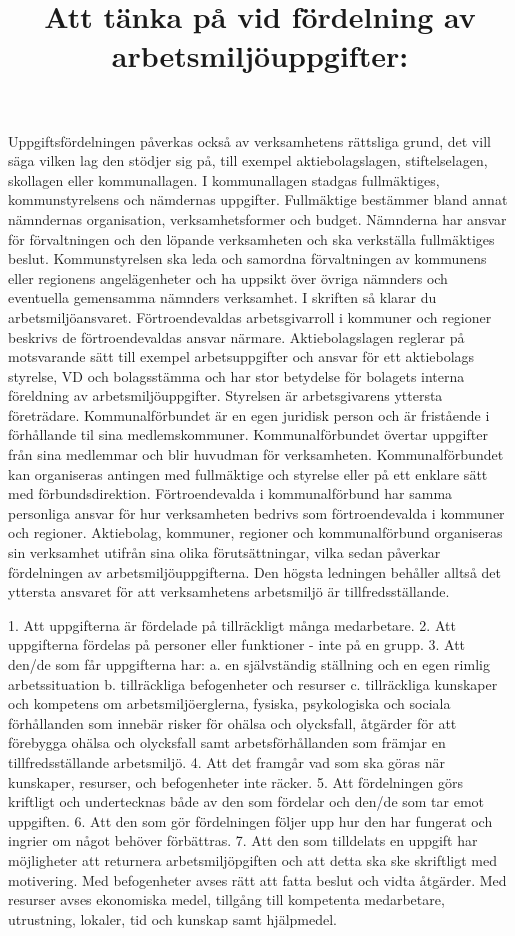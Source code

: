 Uppgiftsfördelningen påverkas också av verksamhetens rättsliga grund, det vill säga vilken lag den stödjer sig på, till exempel aktiebolagslagen, stiftelselagen, skollagen eller kommunallagen.
I kommunallagen stadgas fullmäktiges, kommunstyrelsens och nämdernas uppgifter. Fullmäktige bestämmer bland annat nämndernas organisation, verksamhetsformer och budget. Nämnderna har ansvar för förvaltningen och den löpande verksamheten och ska verkställa fullmäktiges beslut. Kommunstyrelsen ska leda och samordna förvaltningen av kommunens eller regionens angelägenheter och ha uppsikt över övriga nämnders och eventuella gemensamma nämnders verksamhet. I skriften så klarar du arbetsmiljöansvaret. Förtroendevaldas arbetsgivarroll i kommuner och regioner beskrivs de förtroendevaldas ansvar närmare. Aktiebolagslagen reglerar på motsvarande sätt till exempel arbetsuppgifter och ansvar för ett aktiebolags styrelse, VD och bolagsstämma och har stor betydelse för bolagets interna föreldning av arbetsmiljöuppgifter. Styrelsen är arbetsgivarens yttersta företrädare.
Kommunalförbundet är en egen juridisk person och är fristående i förhållande til sina medlemskommuner. Kommunalförbundet övertar uppgifter från sina medlemmar och blir huvudman för verksamheten. Kommunalförbundet kan organiseras antingen med fullmäktige och styrelse eller på ett enklare sätt med förbundsdirektion. Förtroendevalda i kommunalförbund har samma personliga ansvar för hur verksamheten bedrivs som förtroendevalda i kommuner och regioner. Aktiebolag, kommuner, regioner och kommunalförbund organiseras sin verksamhet utifrån sina olika förutsättningar, vilka sedan påverkar fördelningen av arbetsmiljöuppgifterna. Den högsta ledningen behåller alltså det yttersta ansvaret för att verksamhetens arbetsmiljö är tillfredsställande.

\title{
Att tänka på vid fördelning av arbetsmiljöuppgifter:
}
1. Att uppgifterna är fördelade på tillräckligt många medarbetare.
2. Att uppgifterna fördelas på personer eller funktioner - inte på en grupp.
3. Att den/de som får uppgifterna har:
a. en självständig ställning och en egen rimlig arbetssituation
b. tillräckliga befogenheter och resurser
c. tillräckliga kunskaper och kompetens om arbetsmiljöerglerna, fysiska, psykologiska och sociala förhållanden som innebär risker för ohälsa och olycksfall, åtgärder för att förebygga ohälsa och olycksfall samt arbetsförhållanden som främjar en tillfredsställande arbetsmiljö.
4. Att det framgår vad som ska göras när kunskaper, resurser, och befogenheter inte räcker.
5. Att fördelningen görs kriftligt och undertecknas både av den som fördelar och den/de som tar emot uppgiften.
6. Att den som gör fördelningen följer upp hur den har fungerat och ingrier om något behöver förbättras.
7. Att den som tilldelats en uppgift har möjligheter att returnera arbetsmiljöpgiften och att detta ska ske skriftligt med motivering.
Med befogenheter avses rätt att fatta beslut och vidta åtgärder.
Med resurser avses ekonomiska medel, tillgång till kompetenta medarbetare, utrustning, lokaler, tid och kunskap samt hjälpmedel.

